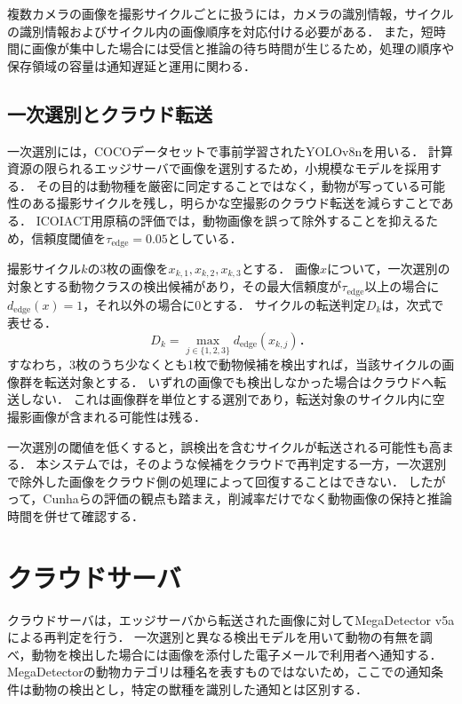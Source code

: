 複数カメラの画像を撮影サイクルごとに扱うには，カメラの識別情報，サイクルの識別情報およびサイクル内の画像順序を対応付ける必要がある．
また，短時間に画像が集中した場合には受信と推論の待ち時間が生じるため，処理の順序や保存領域の容量は通知遅延と運用に関わる．

\subsection{一次選別とクラウド転送}
一次選別には，COCOデータセットで事前学習されたYOLOv8nを用いる．
計算資源の限られるエッジサーバで画像を選別するため，小規模なモデルを採用する．
その目的は動物種を厳密に同定することではなく，動物が写っている可能性のある撮影サイクルを残し，明らかな空撮影のクラウド転送を減らすことである．
ICOIACT用原稿の評価では，動物画像を誤って除外することを抑えるため，信頼度閾値を$\tau_{\mathrm{edge}}=0.05$としている．

撮影サイクル$k$の3枚の画像を$x_{k,1},x_{k,2},x_{k,3}$とする．
画像$x$について，一次選別の対象とする動物クラスの検出候補があり，その最大信頼度が$\tau_{\mathrm{edge}}$以上の場合に$d_{\mathrm{edge}}(x)=1$，それ以外の場合に0とする．
サイクルの転送判定$D_k$は，次式で表せる．
\begin{equation}
  D_k=\max_{j\in\{1,2,3\}}d_{\mathrm{edge}}(x_{k,j})．
  \label{eq:system-cycle-selection}
\end{equation}
すなわち，3枚のうち少なくとも1枚で動物候補を検出すれば，当該サイクルの画像群を転送対象とする．
いずれの画像でも検出しなかった場合はクラウドへ転送しない．
これは画像群を単位とする選別であり，転送対象のサイクル内に空撮影画像が含まれる可能性は残る．

一次選別の閾値を低くすると，誤検出を含むサイクルが転送される可能性も高まる．
本システムでは，そのような候補をクラウドで再判定する一方，一次選別で除外した画像をクラウド側の処理によって回復することはできない．
したがって，Cunhaら\cite{Cunha2021}の評価の観点も踏まえ，削減率だけでなく動物画像の保持と推論時間を併せて確認する．

\section{クラウドサーバ}
クラウドサーバは，エッジサーバから転送された画像に対してMegaDetector v5aによる再判定を行う．
一次選別と異なる検出モデルを用いて動物の有無を調べ，動物を検出した場合には画像を添付した電子メールで利用者へ通知する．
MegaDetectorの動物カテゴリは種名を表すものではないため，ここでの通知条件は動物の検出とし，特定の獣種を識別した通知とは区別する．


